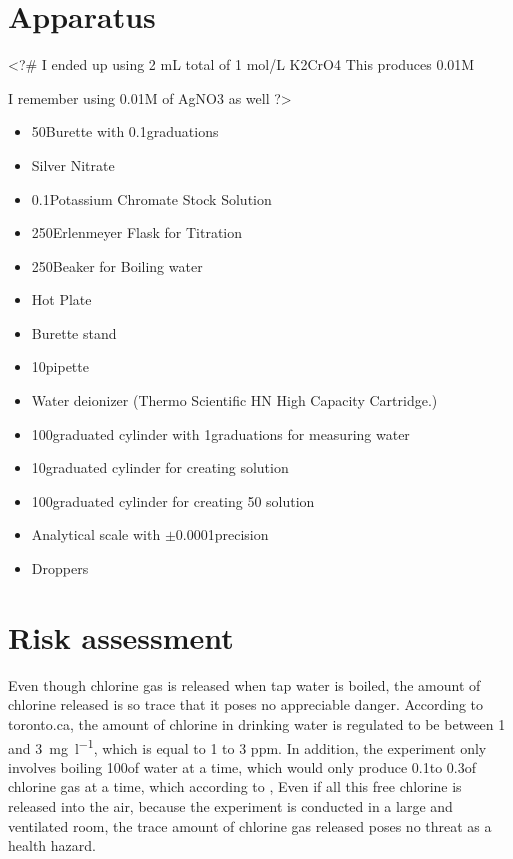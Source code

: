 \documentclass[11pt]{article}
\begin{document}
\section{Apparatus}

<?#
I ended up using 2 mL total of 1 mol/L K2CrO4
This produces 0.01M

I remember using 0.01M of AgNO3 as well
?>

\begin{itemize}
	\item 50\ml Burette with 0.1\ml graduations
	\item Silver Nitrate
	\item 0.1\mpl Potassium Chromate Stock Solution
	\item 250\ml Erlenmeyer Flask for Titration
	\item 250\ml Beaker for Boiling water
	\item Hot Plate
	\item Burette stand
	\item 10\ml pipette
	\item Water deionizer (Thermo Scientific HN High Capacity Cartridge.)
	\item 100\ml graduated cylinder with 1\ml graduations for measuring water
	\item 10\ml graduated cylinder for creating  solution
	\item 100\ml graduated cylinder for creating 50\ml {} solution
	\item Analytical scale with $\pm$0.0001\gram precision
	\item Droppers
\end{itemize}

\section{Risk assessment}

Even though chlorine gas is released when tap water is boiled, the amount of chlorine released is so trace that it poses no appreciable danger. According to toronto.ca, the amount of chlorine in drinking water is regulated to be between 1 and \SI{3}{\mg\per\litre}, which is equal to 1 to 3 ppm. In addition, the experiment only involves boiling 100\ml of water at a time, which would only produce 0.1\mg to 0.3\mg of chlorine gas at a time, which according to ,
Even if all this free chlorine is released into the air, because the experiment is conducted in a large and ventilated room, the trace amount of chlorine gas released poses no threat as a health hazard.
\end{document}
